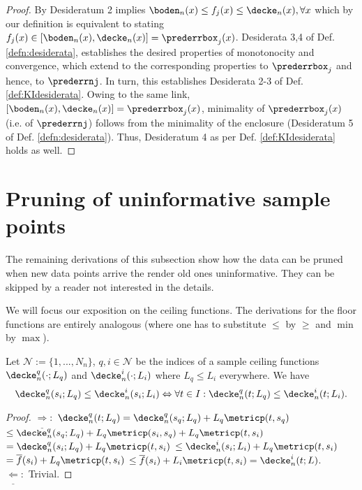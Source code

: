 \begin{proof}
By Desideratum 2 implies $\boden_n(x) \leq f_j(x) \leq \decke_n(x), \forall x$ which by our definition is equivalent to stating $f_j(x) \in [\boden_n(x), \decke_n(x)] = \prederrbox_j(x)$. Desiderata 3,4 of Def. \ref{defn:desiderata}, establishes the desired properties of monotonocity and convergence, which extend to the corresponding properties to $\prederrbox_j$ and hence, to $\prederrnj$. In turn, this establishes Desiderata 2-3 of Def. \ref{def:KIdesiderata}. 
Owing to the same link, $[\boden_n(x), \decke_n(x)] = \prederrbox_j(x)$, minimality of $\prederrbox_j(x)$ (i.e. of $\prederrnj$) follows from the minimality of the enclosure (Desideratum 5 of Def. \ref{defn:desiderata}). Thus, Desideratum 4 as per Def. \ref{def:KIdesiderata} holds as well.

\end{proof}

\section{Pruning of uninformative sample points}

The remaining derivations of this subsection show how the data can be pruned when new data points arrive the render old ones uninformative. They can be skipped by a reader not interested in the details.


We will focus our exposition on the ceiling functions. The derivations for the floor functions are entirely analogous (where one has to substitute $\leq$ by $\geq$ and $\min$ by $\max$).

\begin{lem}\label{lem:dominatedsamplefct}
Let $\mathcal N := \{1,...,N_n\}$, $q,i \in \mathcal N$ be the indices of a sample ceiling functions $\decke_n^q(\cdot;L_q)$ and $\decke_n^i(\cdot;L_i)$ where $L_q \leq L_i$ everywhere. We have
\[\decke_n^q(s_i;L_q) \leq \decke_n^i(s_i;L_i) \Leftrightarrow \forall t \in I: \decke_n^q(t;L_q) \leq \decke_n^i(t;L_i).\]
\begin{proof}
$\underline \Rightarrow:$
$\decke_n^q (t;L_q) = \decke_n^q(s_q;L_q) + L_q \metricp(t, s_q)$
$\leq \decke_n^q(s_q;L_q) +L_q \metricp(s_i, s_q)+ L_q\metricp(t,s_i) $
$=\decke_n^q(s_i;L_q) +  L_q\metricp(t,s_i)$ 
$\leq \decke_n^i(s_i;L_i) + L_q\metricp(t,s_i)  $
$= \overline f(s_i) + L_q\metricp(t,s_i)    $
$\leq \overline f(s_i) + L_i\metricp(t,s_i)    = \decke_n^i(t;L)$.\\
$\underline \Leftarrow:$ Trivial.
\end{proof}
\end{lem}

